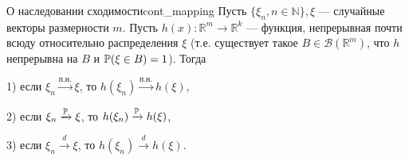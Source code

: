 \vspace{1em}
\begin{theorem}{О наследовании сходимости}{cont_mapping}
    Пусть $\{\xi_n, n \in \mathbb{N}\}, \xi$ --- случайные векторы размерности $m$. Пусть $h(x) : \mathbb{R}^m \to \mathbb{R}^k$ --- функция, непрерывная почти всюду относительно распределения $\xi$ (т.е. существует такое $B \in \mathcal{B}(\mathbb{R}^m)$, что $h$ непрерывна на $B$ и $\P(\xi \in B) = 1$). Тогда
    
    1) если $\xi_n \xrightarrow{\text{п.н.}} \xi$, то $h(\xi_n) \xrightarrow{\text{п.н.}} h(\xi)$,
    
    2) если $\xi_n \xrightarrow{\P} \xi$, то $h(\xi_n) \xrightarrow{\P} h(\xi)$,
    
    3) если $\xi_n \xrightarrow{d} \xi$, то $h(\xi_n) \xrightarrow{d} h(\xi)$.
\end{theorem}

